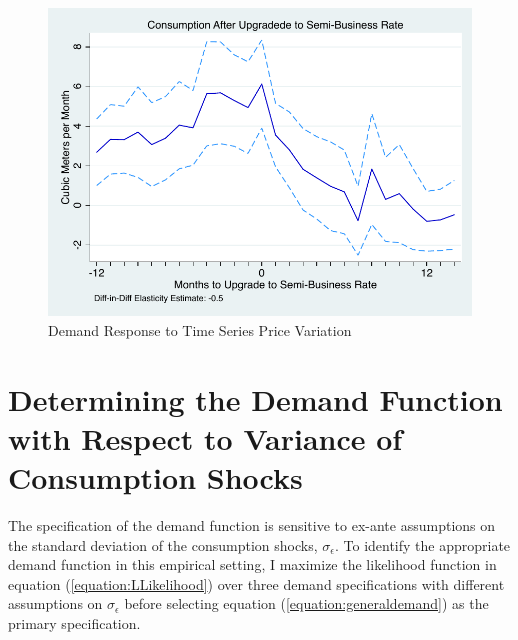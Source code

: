\documentclass[12pt]{article}
\begin{document}
\begin{appendices}
\begin{figure}
\caption{Demand Response to Time Series Price Variation}\label{figure:semieventstudy}
\begin{center}
\includegraphics[scale=.7]{tables/sem_event.pdf}
\end{center}
\end{figure}







\section{Determining the Demand Function with Respect to Variance of Consumption Shocks}\label{appendix:sigmanuassumptions}

The specification of the demand function is sensitive to ex-ante assumptions on the standard deviation of the consumption shocks, $\sigma_{\epsilon}$.  To identify the appropriate demand function in this empirical setting, I maximize the likelihood function in equation (\ref{equation:LLikelihood}) over three demand specifications with different assumptions on $\sigma_{\epsilon}$ before selecting equation (\ref{equation:generaldemand}) as the primary specification.  


\end{appendices}
\end{document}
